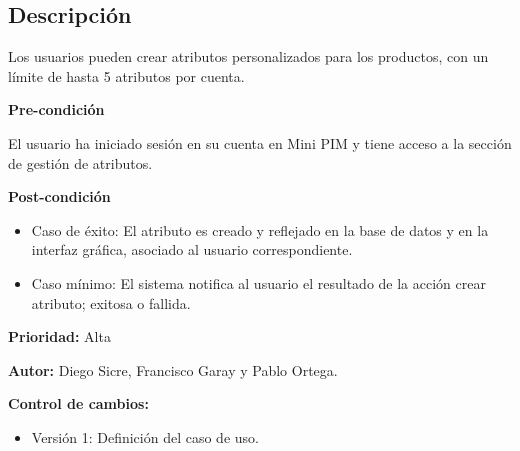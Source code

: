 
\subsection*{Descripción}
Los usuarios pueden crear atributos personalizados para los productos, con un límite de hasta 5 atributos por cuenta.
\vspace{0.15cm}

\textbf{Pre-condición}\par
El usuario ha iniciado sesión en su cuenta en Mini PIM y tiene acceso a la sección de gestión de atributos.\par
\vspace{0.15cm}

\textbf{Post-condición}
\begin{itemize}
    \item Caso de éxito: El atributo es creado y reflejado en la base de datos y en la interfaz gráfica, asociado al usuario correspondiente.
    \item Caso mínimo: El sistema notifica al usuario el resultado de la acción crear atributo; exitosa o fallida.
\end{itemize}

\textbf{Prioridad: }
Alta
\vspace{0.15cm}

\textbf{Autor: }
Diego Sicre, Francisco Garay y Pablo Ortega.\par
\vspace{0.15cm}

\textbf{Control de cambios: }
\begin{itemize}
    \item Versión 1: Definición del caso de uso.
\end{itemize}

